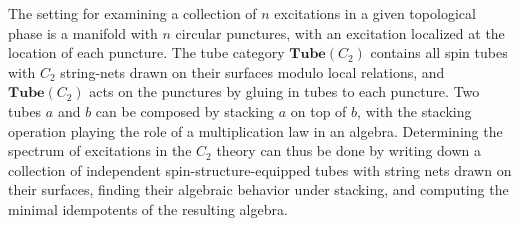 \documentclass[12pt,a4paper]{article}
\newcommand{\tube}{\textbf{Tube}}
\begin{document}
The setting for examining a collection of $n$ excitations in a given topological phase is a manifold with $n$ circular punctures, with an excitation localized at the location of each puncture. 
The tube category $\tube(C_2)$ contains all spin tubes with $C_2$ string-nets drawn on their surfaces modulo local relations, and $\tube(C_2)$ acts on the punctures by gluing in tubes to each puncture. 
Two tubes $a$ and $b$ can be composed by stacking $a$ on top of $b$, with the stacking operation playing the role of a multiplication law in an algebra. 
Determining the spectrum of excitations in the $C_2$ theory can thus be done by writing down a collection of independent spin-structure-equipped tubes with string nets drawn on their surfaces, finding their algebraic behavior under stacking, and computing the minimal idempotents of the resulting algebra. 
\end{document}
